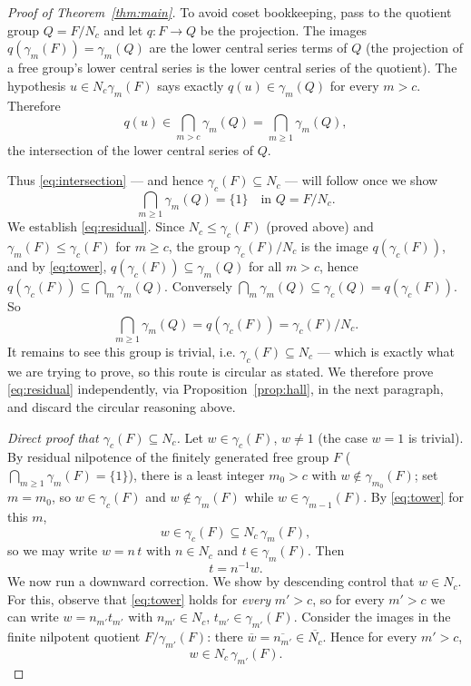 \documentclass{amsart}
\theoremstyle{definition}
\theoremstyle{remark}
\begin{document}
\begin{proof}[Proof of Theorem~\ref{thm:main}]
To avoid coset bookkeeping, pass to the quotient group $Q=F/N_c$ and let
$q\colon F\to Q$ be the projection. The images $q(\gamma_m(F))=\gamma_m(Q)$ are the
lower central series terms of $Q$ (the projection of a free group's lower central
series is the lower central series of the quotient). The hypothesis $u\in
N_c\gamma_m(F)$ says exactly $q(u)\in\gamma_m(Q)$ for every $m>c$. Therefore
\[
q(u)\in\bigcap_{m>c}\gamma_m(Q)=\bigcap_{m\ge 1}\gamma_m(Q),
\]
the intersection of the lower central series of $Q$.

Thus \eqref{eq:intersection} — and hence $\gamma_c(F)\subseteq N_c$ — will follow
once we show
\begin{equation}\label{eq:residual}
\bigcap_{m\ge 1}\gamma_m(Q)=\{1\}\quad\text{in } Q=F/N_c .
\end{equation}
We establish \eqref{eq:residual}. Since $N_c\le\gamma_c(F)$ (proved above) and
$\gamma_m(F)\le\gamma_c(F)$ for $m\ge c$, the group
$\gamma_c(F)/N_c$ is the image $q(\gamma_c(F))$, and by \eqref{eq:tower},
$q(\gamma_c(F))\subseteq\gamma_m(Q)$ for all $m>c$, hence
$q(\gamma_c(F))\subseteq\bigcap_{m}\gamma_m(Q)$. Conversely
$\bigcap_m\gamma_m(Q)\subseteq\gamma_c(Q)=q(\gamma_c(F))$. So
\[
\bigcap_{m\ge 1}\gamma_m(Q)=q(\gamma_c(F))=\gamma_c(F)/N_c .
\]
It remains to see this group is trivial, i.e. $\gamma_c(F)\subseteq N_c$ — which is
exactly what we are trying to prove, so this route is circular as stated. We
therefore prove \eqref{eq:residual} independently, via Proposition~\ref{prop:hall},
in the next paragraph, and discard the circular reasoning above.

\emph{Direct proof that $\gamma_c(F)\subseteq N_c$.}
Let $w\in\gamma_c(F)$, $w\neq 1$ (the case $w=1$ is trivial). By residual
nilpotence of the finitely generated free group $F$
($\bigcap_{m\ge1}\gamma_m(F)=\{1\}$), there is a least integer $m_0>c$ with
$w\notin\gamma_{m_0}(F)$; set $m=m_0$, so $w\in\gamma_{c}(F)$ and
$w\notin\gamma_{m}(F)$ while $w\in\gamma_{m-1}(F)$. By \eqref{eq:tower} for this
$m$,
\[
w\in\gamma_c(F)\subseteq N_c\,\gamma_m(F),
\]
so we may write $w=n\,t$ with $n\in N_c$ and $t\in\gamma_m(F)$. Then
\[
t=n^{-1}w .
\]
We now run a downward correction. We show by descending control that $w\in N_c$.
For this, observe that \eqref{eq:tower} holds for \emph{every} $m'>c$, so for every
$m'>c$ we can write $w=n_{m'}t_{m'}$ with $n_{m'}\in N_c$, $t_{m'}\in\gamma_{m'}(F)$.
Consider the images in the finite nilpotent quotient $F/\gamma_{m'}(F)$: there
$\overline{w}=\overline{n_{m'}}\in\overline{N_c}$. Hence for every $m'>c$,
\begin{equation}\label{eq:in-quotient}
w\in N_c\,\gamma_{m'}(F).
\end{equation}


\end{proof}
\end{document}
